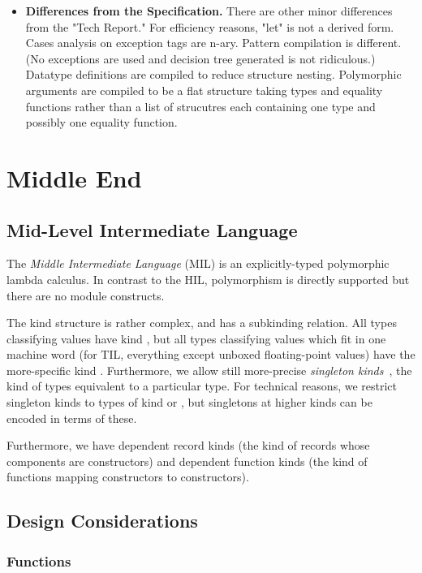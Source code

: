 \documentclass[twoside]{article}
\begin{document}
\begin{itemize}
\item \textbf{Differences from the Specification. }
There are other minor differences from the "Tech Report."  For
efficiency reasons, "let" is not a derived form.  Cases analysis on
exception tags are n-ary.  Pattern compilation is different.  (No
exceptions are used and decision tree generated is not ridiculous.)
Datatype definitions are compiled to reduce structure nesting.
Polymorphic arguments are compiled to be a flat structure taking types
and equality functions rather than a list of strucutres each
containing one type and possibly one equality function.

\end{itemize}

\section{Middle End}

\subsection{Mid-Level Intermediate Language}

The \textit{Middle Intermediate Language} (MIL) is an explicitly-typed
polymorphic lambda calculus.  In contrast to the HIL, polymorphism is
directly supported but there are no module constructs.  

The kind structure is rather complex, and has a subkinding
relation.  All types classifying values have kind , but
all types classifying values which fit in one machine word
(for TIL, everything except unboxed floating-point values) have
the more-specific kind .  Furthermore, we allow
still more-precise \textit{singleton kinds}~\cite{???}, 
the kind of types equivalent to a particular type.
For technical reasons, we restrict singleton kinds to
types of kind  or , but singletons at higher
kinds can be encoded in terms of these.

Furthermore, we have dependent record kinds (the kind of
records whose components are constructors) and dependent function
kinds (the kind of functions mapping constructors to constructors).

\subsection{Design Considerations}

\subsubsection{Functions}
\end{document}
